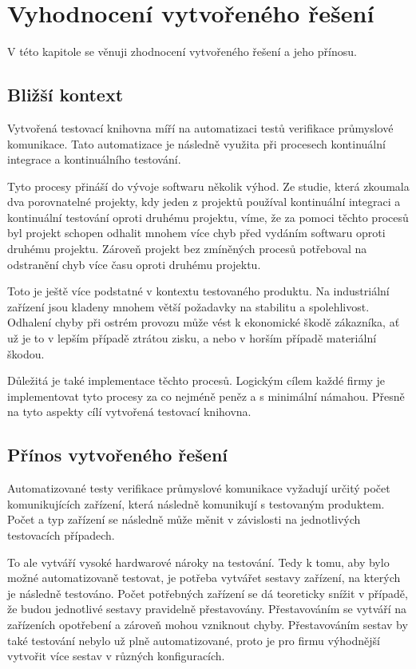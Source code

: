 \chapter{Vyhodnocení vytvořeného řešení}\label{chap:evaluation}

V této kapitole se věnuji zhodnocení vytvořeného řešení a jeho přínosu.


\section{Bližší kontext}
Vytvořená testovací knihovna míří na automatizaci testů verifikace průmyslové komunikace. Tato automatizace je následně využita při procesech kontinuální integrace a kontinuálního testování. 

Tyto procesy přináší do vývoje softwaru několik výhod. Ze studie, která zkoumala dva porovnatelné projekty, kdy jeden z projektů používal kontinuální integraci a kontinuální testování oproti druhému projektu, víme, že za pomoci těchto procesů byl projekt schopen odhalit mnohem více chyb před vydáním softwaru oproti druhému projektu. Zároveň projekt bez zmíněných procesů potřeboval na odstranění chyb více času oproti druhému projektu. \cite{ci_study}

Toto je ještě více podstatné v kontextu testovaného produktu. Na industriální zařízení jsou kladeny mnohem větší požadavky na stabilitu a spolehlivost. Odhalení chyby při ostrém provozu může vést k ekonomické škodě zákazníka, ať už je to v lepším případě ztrátou zisku, a nebo v horším případě materiální škodou.

Důležitá je také implementace těchto procesů. Logickým cílem každé firmy je implementovat tyto procesy za co nejméně peněz a s minimální námahou. Přesně na tyto aspekty cílí vytvořená testovací knihovna. 


\section{Přínos vytvořeného řešení}

Automatizované testy verifikace průmyslové komunikace vyžadují určitý počet komunikujících zařízení, která následně komunikují s testovaným produktem. Počet a typ zařízení se následně může měnit v závislosti na jednotlivých testovacích případech.  

To ale vytváří vysoké hardwarové nároky na testování. Tedy k tomu, aby bylo možné automatizovaně testovat, je potřeba vytvářet sestavy zařízení, na kterých je následně testováno. Počet potřebných zařízení se dá teoreticky snížit v případě, že budou jednotlivé sestavy pravidelně přestavovány. Přestavováním se vytváří na zařízeních opotřebení a zároveň mohou vzniknout chyby. Přestavováním sestav by také testování nebylo už plně automatizované, proto je pro firmu výhodnější vytvořit více sestav v různých konfiguracích.

